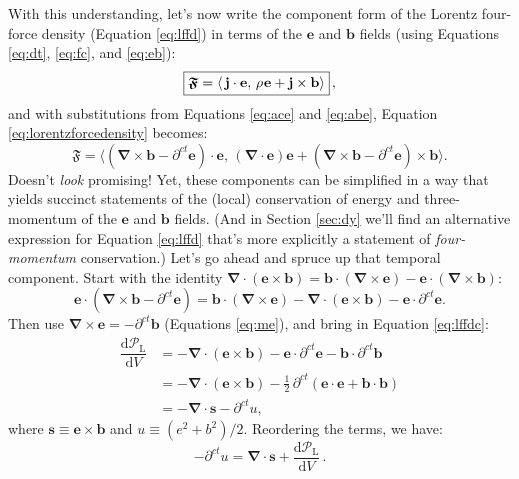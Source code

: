 \documentclass[12pt]{article}
\renewcommand{\vv}[1]{\mathbf{#1}}
\newcommand{\dd}[1]{\mathrm{d}#1}
\newcommand{\del}{\boldsymbol{\nabla}}
\begin{document}
With this understanding, let's now write the component form of the Lorentz four-force density (Equation \ref{eq:lffd}) in terms of the $\vv e$ and $\vv b$ fields (using Equations \ref{eq:dt}, \ref{eq:fc}, and \ref{eq:eb}):
\begin{equation}\label{eq:lorentzforcedensity}
\boxed{ \bm{\mathfrak{F}} = \left \langle \, \vv j \cdot \vv e, \, \rho \mkern1mu \vv e + \vv j \times \vv b \right \rangle } \, ,
\end{equation}
and with substitutions from Equations \ref{eq:ace} and \ref{eq:abe}, Equation \ref{eq:lorentzforcedensity} becomes:
\begin{equation}\label{eq:lffdc2}
\bm{\mathfrak{F}} = \Big \langle \left( \del \times \vv b - \partial^{ct} \vv e \right) \cdot \vv e , \, \left( \del \cdot \vv e \right) \vv e + \left( \del \times \vv b - \partial^{ct} \vv e \right) \times \vv b \Big \rangle .
\end{equation}
Doesn't \emph{look} promising! Yet, these components can be simplified in a way that yields succinct statements of the (local) conservation of energy and three-momentum of the $\vv e$ and $\vv b$ fields. (And in Section \ref{sec:dy} we'll find an alternative expression for Equation \ref{eq:lffd} that's more explicitly a statement of \emph{four-momentum} conservation.) Let's go ahead and spruce up that temporal component. Start with the identity $\del \cdot (\vv e \times \vv b) = \vv b \cdot (\del \times \vv e) - \vv e \cdot (\del \times \vv b)$:
\begin{equation*}
\vv e \cdot \left( \del \times \vv b - \partial^{ct} \vv e \right) = \vv b \cdot \left( \del \times \vv e \right) - \del \cdot \left( \vv e \times \vv b \right) - \vv e \cdot \partial^{ct} \vv e .
\end{equation*}
Then use $\del \times \vv e = - \partial^{ct} \vv b$ (Equations \ref{eq:me}), and bring in Equation \ref{eq:lffdc}:
\begin{equation*}
\begin{split}
\dfrac{\dd \mathcal{P}_{\textrm{L}}}{\dd V} &= - \del \cdot \left( \vv e \times \vv b \right) - \vv e \cdot \partial^{ct} \vv e - \vv b \cdot \partial^{ct} \vv b  \\
&= - \del \cdot \left( \vv e \times \vv b \right) - \frac{1}{2} \, \partial^{ct} \left( \vv e \cdot \vv e + \vv b \cdot \vv b \right) \\[2pt]
&= - \del \cdot \vv s - \partial^{ct} u ,
\end{split}
\end{equation*}
where $\vv s \equiv \vv e \times \vv b$ and $u \equiv (e^2 + b^2)/2$. Reordering the terms, we have:
\begin{equation}\label{eq:py}
\boxed{ - \partial^{ct} u =  \del \cdot \vv s + \dfrac{\dd \mathcal{P}_{\textrm{L}}}{\dd V} } \, .
\end{equation}
\end{document}
